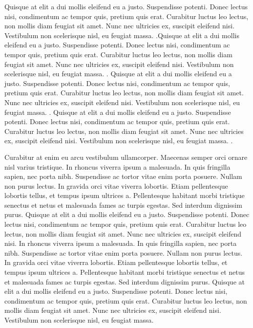 \documentclass[11pt]{report}
\begin{document}
Quisque at elit a dui mollis eleifend eu a justo. Suspendisse potenti. Donec lectus nisi, condimentum ac tempor quis, pretium quis erat. Curabitur luctus leo lectus, non mollis diam feugiat sit amet. Nunc nec ultricies ex, suscipit eleifend nisi. Vestibulum non scelerisque nisl, eu feugiat massa.  
 \cite{booth1998molecular}.Quisque at elit a dui mollis eleifend eu a justo. Suspendisse potenti. Donec lectus nisi, condimentum ac tempor quis, pretium quis erat. Curabitur luctus leo lectus, non mollis diam feugiat sit amet. Nunc nec ultricies ex, suscipit eleifend nisi. Vestibulum non scelerisque nisl, eu feugiat massa.  \cite{wilber2012kenyan}. Quisque at elit a dui mollis eleifend eu a justo. Suspendisse potenti. Donec lectus nisi, condimentum ac tempor quis, pretium quis erat. Curabitur luctus leo lectus, non mollis diam feugiat sit amet. Nunc nec ultricies ex, suscipit eleifend nisi. Vestibulum non scelerisque nisl, eu feugiat massa. \cite{levine1997living, loland2002technology}. Quisque at elit a dui mollis eleifend eu a justo. Suspendisse potenti. Donec lectus nisi, condimentum ac tempor quis, pretium quis erat. Curabitur luctus leo lectus, non mollis diam feugiat sit amet. Nunc nec ultricies ex, suscipit eleifend nisi. Vestibulum non scelerisque nisl, eu feugiat massa. \cite{fitch2016world}. 

Curabitur at enim eu arcu vestibulum ullamcorper. Maecenas semper orci ornare nisl varius tristique. In rhoncus viverra ipsum a malesuada. In quis fringilla sapien, nec porta nibh. Suspendisse ac tortor vitae enim porta posuere. Nullam non purus lectus. In gravida orci vitae viverra lobortis. Etiam pellentesque lobortis tellus, et tempus ipsum ultrices a. Pellentesque habitant morbi tristique senectus et netus et malesuada fames ac turpis egestas. Sed interdum dignissim purus. Quisque at elit a dui mollis eleifend eu a justo. Suspendisse potenti. Donec lectus nisi, condimentum ac tempor quis, pretium quis erat. Curabitur luctus leo lectus, non mollis diam feugiat sit amet. Nunc nec ultricies ex, suscipit eleifend nisi. In rhoncus viverra ipsum a malesuada. In quis fringilla sapien, nec porta nibh. Suspendisse ac tortor vitae enim porta posuere. Nullam non purus lectus. In gravida orci vitae viverra lobortis. Etiam pellentesque lobortis tellus, et tempus ipsum ultrices a. Pellentesque habitant morbi tristique senectus et netus et malesuada fames ac turpis egestas. Sed interdum dignissim purus. Quisque at elit a dui mollis eleifend eu a justo. Suspendisse potenti. Donec lectus nisi, condimentum ac tempor quis, pretium quis erat. Curabitur luctus leo lectus, non mollis diam feugiat sit amet. Nunc nec ultricies ex, suscipit eleifend nisi. Vestibulum non scelerisque nisl, eu feugiat massa.  
\end{document}
